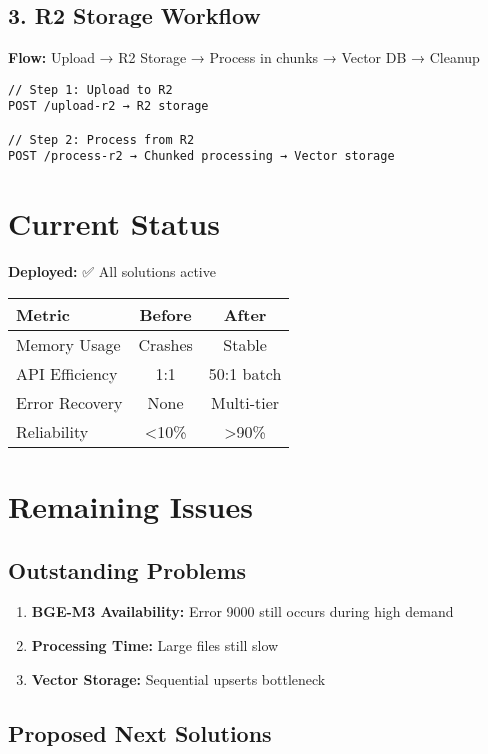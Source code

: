 \documentclass[11pt,a4paper]{article}
\begin{document}
\subsection{3. R2 Storage Workflow}
\textbf{Flow:} Upload → R2 Storage → Process in chunks → Vector DB → Cleanup

\begin{lstlisting}
// Step 1: Upload to R2
POST /upload-r2 → R2 storage

// Step 2: Process from R2
POST /process-r2 → Chunked processing → Vector storage
\end{lstlisting}

\section{Current Status}

\textbf{Deployed:} ✅ All solutions active

\begin{table}[h]
\centering
\begin{tabular}{@{}lcc@{}}
\toprule
\textbf{Metric} & \textbf{Before} & \textbf{After} \\
\midrule
Memory Usage & Crashes & Stable \\
API Efficiency & 1:1 & 50:1 batch \\
Error Recovery & None & Multi-tier \\
Reliability & <10\% & >90\% \\
\bottomrule
\end{tabular}
\end{table}

\section{Remaining Issues}

\subsection{Outstanding Problems}
\begin{enumerate}
    \item \textbf{BGE-M3 Availability:} Error 9000 still occurs during high demand
    \item \textbf{Processing Time:} Large files still slow
    \item \textbf{Vector Storage:} Sequential upserts bottleneck
\end{enumerate}

\subsection{Proposed Next Solutions}
\end{document}
